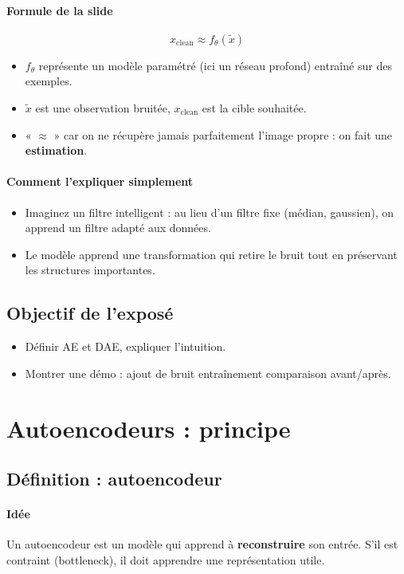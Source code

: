 \documentclass[11pt,a4paper]{article}
\begin{document}
\paragraph{Formule de la slide}
\[
  x_{\text{clean}} \approx f_\theta(\tilde{x})
\]
\begin{itemize}
  \item $f_\theta$ représente un modèle paramétré (ici un réseau profond) entraîné sur des exemples.
  \item $\tilde{x}$ est une observation bruitée, $x_{\text{clean}}$ est la cible souhaitée.
  \item « $\approx$ » car on ne récupère jamais parfaitement l'image propre : on fait une \textbf{estimation}.
\end{itemize}

\paragraph{Comment l'expliquer simplement}
\begin{itemize}
  \item Imaginez un filtre intelligent : au lieu d'un filtre fixe (médian, gaussien), on apprend un filtre adapté aux données.
  \item Le modèle apprend une transformation qui retire le bruit tout en préservant les structures importantes.
\end{itemize}

\subsection{Objectif de l'exposé}
\begin{itemize}
  \item Définir AE et DAE, expliquer l'intuition.
  \item Montrer une démo : ajout de bruit \textrightarrow{} entraînement \textrightarrow{} comparaison avant/après.
\end{itemize}

\section{Autoencodeurs : principe}

\subsection{Définition : autoencodeur}
\paragraph{Idée}
Un autoencodeur est un modèle qui apprend à \textbf{reconstruire} son entrée. S'il est contraint (bottleneck), il doit apprendre une représentation utile.
\end{document}

